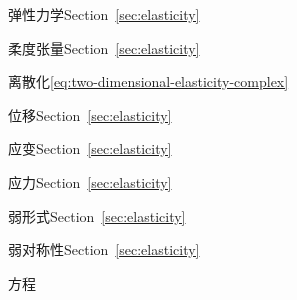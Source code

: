 \par\noindent\hspace*{0em}\label{index:elasticity}{弹性力学}\quad Section~\ref{sec:elasticity}

\par\noindent\hspace*{1em}\label{index:elasticity-compliance-tensor}{柔度张量}\quad Section~\ref{sec:elasticity}

\par\noindent\hspace*{1em}\label{index:elasticity-discretization}{离散化}\quad \eqref{eq:two-dimensional-elasticity-complex}

\par\noindent\hspace*{1em}\label{index:elasticity-displacement}{位移}\quad Section~\ref{sec:elasticity}

\par\noindent\hspace*{1em}\label{index:elasticity-strain}{应变}\quad Section~\ref{sec:elasticity}

\par\noindent\hspace*{1em}\label{index:elasticity-stress}{应力}\quad Section~\ref{sec:elasticity}

\par\noindent\hspace*{1em}\label{index:elasticity-weak-formulation}{弱形式}\quad Section~\ref{sec:elasticity}

\par\noindent\hspace*{1em}\label{index:elasticity-weak-symmetry}{弱对称性}\quad Section~\ref{sec:elasticity}

\par\noindent\hspace*{0em}\label{index:equation}{方程}

